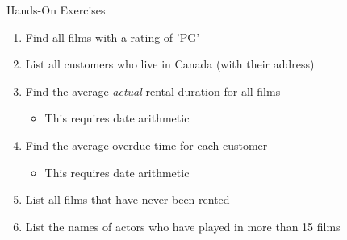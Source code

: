 \documentclass[ignorenonframetext,xcolor=x11names]{beamer}
\begin{document}
\begin{frame}{Hands-On Exercises}
\begin{enumerate}
  \item Find all films with a rating of 'PG'
  \item List all customers who live in Canada (with their address)
  \item Find the average \emph{actual} rental duration for all films
  \begin{itemize}
     \item This requires date arithmetic
  \end{itemize}
  \item Find the average overdue time for each customer
  \begin{itemize}
     \item This requires date arithmetic
  \end{itemize}
  \item List all films that have never been rented
  \item List the names of actors who have played in more than 15 films
\end{enumerate}
\end{frame}
\end{document}
